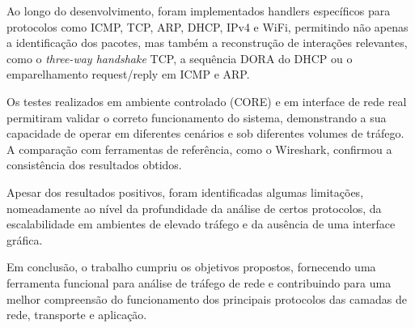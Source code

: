\documentclass[a4paper,12pt]{article}
\begin{document}
Ao longo do desenvolvimento, foram implementados handlers específicos para protocolos como ICMP, TCP, ARP, DHCP, IPv4 e WiFi, permitindo não apenas a identificação dos pacotes, mas também a reconstrução de interações relevantes, como o \textit{three-way handshake} TCP, a sequência DORA do DHCP ou o emparelhamento request/reply em ICMP e ARP.

Os testes realizados em ambiente controlado (CORE) e em interface de rede real permitiram validar o correto funcionamento do sistema, demonstrando a sua capacidade de operar em diferentes cenários e sob diferentes volumes de tráfego. A comparação com ferramentas de referência, como o Wireshark, confirmou a consistência dos resultados obtidos.

Apesar dos resultados positivos, foram identificadas algumas limitações, nomeadamente ao nível da profundidade da análise de certos protocolos, da escalabilidade em ambientes de elevado tráfego e da ausência de uma interface gráfica.

Em conclusão, o trabalho cumpriu os objetivos propostos, fornecendo uma ferramenta funcional para análise de tráfego de rede e contribuindo para uma melhor compreensão do funcionamento dos principais protocolos das camadas de rede, transporte e aplicação.
\end{document}
